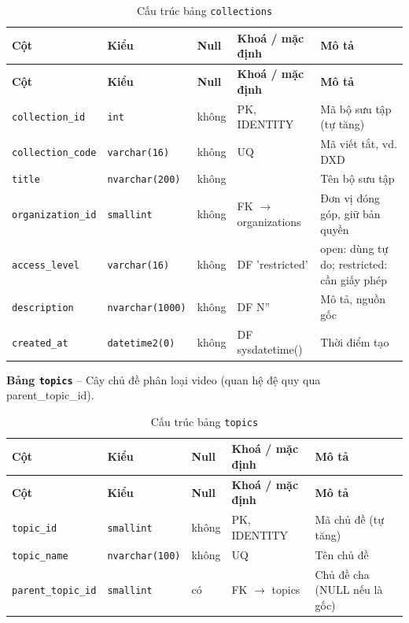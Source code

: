 \setlength{\tabcolsep}{4pt}
\begin{longtable}{>{\raggedright\arraybackslash}p{}>{\raggedright\arraybackslash}p{}>{\centering\arraybackslash}p{}>{\raggedright\arraybackslash}p{}>{\raggedright\arraybackslash}p{}}
\caption{Cấu trúc bảng \texttt{collections}}\label{tab:col_collections}\\
\toprule \textbf{Cột} & \textbf{Kiểu} & \textbf{Null} & \textbf{Khoá / mặc định} & \textbf{Mô tả} \\ \midrule \endfirsthead
\toprule \textbf{Cột} & \textbf{Kiểu} & \textbf{Null} & \textbf{Khoá / mặc định} & \textbf{Mô tả} \\ \midrule \endhead
\bottomrule \endfoot
\texttt{collection\_id} & {\footnotesize\texttt{int}} & không & PK, IDENTITY & Mã bộ sưu tập (tự tăng) \\
\texttt{collection\_code} & {\footnotesize\texttt{varchar(16)}} & không & UQ & Mã viết tắt, vd. DXD \\
\texttt{title} & {\footnotesize\texttt{nvarchar(200)}} & không &  & Tên bộ sưu tập \\
\texttt{organization\_id} & {\footnotesize\texttt{smallint}} & không & FK $\rightarrow$ organizations & Đơn vị đóng góp, giữ bản quyền \\
\texttt{access\_level} & {\footnotesize\texttt{varchar(16)}} & không & DF 'restricted' & open: dùng tự do; restricted: cần giấy phép \\
\texttt{description} & {\footnotesize\texttt{nvarchar(1000)}} & không & DF N'' & Mô tả, nguồn gốc \\
\texttt{created\_at} & {\footnotesize\texttt{datetime2(0)}} & không & DF sysdatetime() & Thời điểm tạo \\
\end{longtable}

\textbf{Bảng \texttt{topics}} -- Cây chủ đề phân loại video (quan hệ đệ quy qua parent\_topic\_id).

\setlength{\tabcolsep}{4pt}
\begin{longtable}{>{\raggedright\arraybackslash}p{}>{\raggedright\arraybackslash}p{}>{\centering\arraybackslash}p{}>{\raggedright\arraybackslash}p{}>{\raggedright\arraybackslash}p{}}
\caption{Cấu trúc bảng \texttt{topics}}\label{tab:col_topics}\\
\toprule \textbf{Cột} & \textbf{Kiểu} & \textbf{Null} & \textbf{Khoá / mặc định} & \textbf{Mô tả} \\ \midrule \endfirsthead
\toprule \textbf{Cột} & \textbf{Kiểu} & \textbf{Null} & \textbf{Khoá / mặc định} & \textbf{Mô tả} \\ \midrule \endhead
\bottomrule \endfoot
\texttt{topic\_id} & {\footnotesize\texttt{smallint}} & không & PK, IDENTITY & Mã chủ đề (tự tăng) \\
\texttt{topic\_name} & {\footnotesize\texttt{nvarchar(100)}} & không & UQ & Tên chủ đề \\
\texttt{parent\_topic\_id} & {\footnotesize\texttt{smallint}} & có & FK $\rightarrow$ topics & Chủ đề cha (NULL nếu là gốc) \\
\end{longtable}

